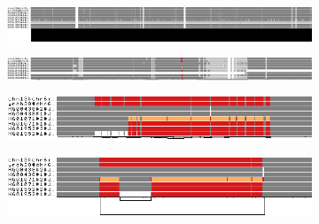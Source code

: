 \begin{figure}[!htb]
    \begin{subfigure}{\linewidth}
        \caption{}
        \centering
        \includegraphics[width=1.0\linewidth, trim=-0cm 0cm 0 0cm]{fig/sorting/chr6_pan_fa_a2fb268_4030258_6a1ecc2_smooth_mhc_random_sorted}
        \label{fig:mhc-random-node-order}
        \vspace{-2em}
    \end{subfigure}
    \begin{subfigure}{\linewidth}
        \caption{}
        \centering
        \includegraphics[width=1.0\linewidth, trim=-0cm 0cm 0 0cm]{fig/sorting/chr6_pan_fa_a2fb268_4030258_6a1ecc2_smooth_mhc_PGSGD_sorted}
        \label{fig:mhc-pgsdg-sorting}
        \vspace{-2em}
    \end{subfigure}
    \begin{subfigure}{1\linewidth}
        \caption{}
        \centering
        \includegraphics[width=1.0\linewidth, trim=-0cm 0.5cm 0 0cm]{fig/sorting/chr6_pan_fa_a2fb268_4030258_6a1ecc2_smooth_C4_PGSGD_sorted}
        \label{fig:c4-pgsdg-sorting}
    \end{subfigure}
    \begin{subfigure}{1\linewidth}
        \caption{}
        \centering
        \includegraphics[width=1.0\linewidth, trim=-0cm 0.5cm 0 0cm]{fig/sorting/chr6_pan_fa_a2fb268_4030258_6a1ecc2_smooth_C4_topologically_sorted}
        \label{fig:c4-topological-sorting}
    \end{subfigure}

\end{figure}
